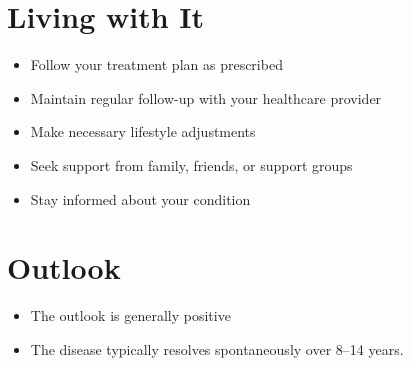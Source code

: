 \section{Living with It}
\begin{itemize}[noitemsep]
  \item Follow your treatment plan as prescribed
  \item Maintain regular follow-up with your healthcare provider
  \item Make necessary lifestyle adjustments
  \item Seek support from family, friends, or support groups
  \item Stay informed about your condition
\end{itemize}
\section{Outlook}
\begin{itemize}[noitemsep]
  \item The outlook is generally positive
  \item The disease typically resolves spontaneously over 8--14 years.
\end{itemize}
